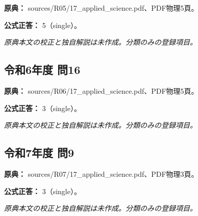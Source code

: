 \noindent\textbf{原典：} sources/R05/17\_applied\_science.pdf、PDF物理5頁。

\textbf{公式正答：} 5（single）。

\par\textit{原典本文の校正と独自解説は未作成。分類のみの登録項目。}

\subsection{令和6年度 問16}
\label{q:r06-reg-applied-16}

\noindent\textbf{原典：} sources/R06/17\_applied\_science.pdf、PDF物理5頁。

\textbf{公式正答：} 3（single）。

\par\textit{原典本文の校正と独自解説は未作成。分類のみの登録項目。}

\subsection{令和7年度 問9}
\label{q:r07-reg-applied-09}

\noindent\textbf{原典：} sources/R07/17\_applied\_science.pdf、PDF物理3頁。

\textbf{公式正答：} 3（single）。

\par\textit{原典本文の校正と独自解説は未作成。分類のみの登録項目。}
